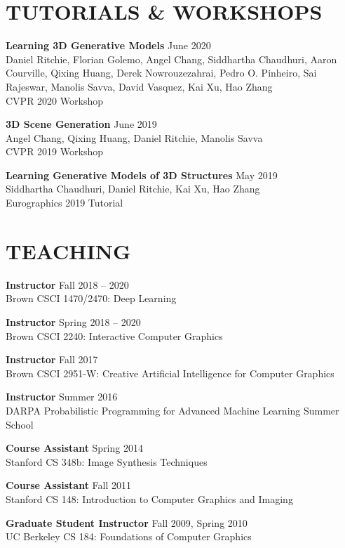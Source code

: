 \documentclass[line,margin]{res}
\begin{document}
\begin{resume}
\section{TUTORIALS \& WORKSHOPS}

\newcommand{\tutorial}[4] {
	\textbf{#1} \hfill #4\\
	#2\\
	#3
}
\newcommand{\workshop}[4] {
	\textbf{#1} \hfill #4\\
	#2\\
	#3
}

\workshop
{Learning 3D Generative Models}
{Daniel Ritchie, Florian Golemo, Angel Chang, Siddhartha Chaudhuri, Aaron Courville, Qixing Huang, Derek Nowrouzezahrai, Pedro O. Pinheiro, Sai Rajeswar, Manolis Savva, David Vasquez, Kai Xu, Hao Zhang}
{CVPR 2020 Workshop}
{June 2020}

\workshop
{3D Scene Generation}
{Angel Chang, Qixing Huang, Daniel Ritchie, Manolis Savva}
{CVPR 2019 Workshop}
{June 2019}

\tutorial
{Learning Generative Models of 3D Structures}
{Siddhartha Chaudhuri, Daniel Ritchie, Kai Xu, Hao Zhang}
{Eurographics 2019 Tutorial}
{May 2019}


\section{TEACHING}

\newcommand{\teach}[3] {
	\textbf{#1} \hfill #3\\
	#2
}

\teach
{Instructor}
{Brown CSCI 1470/2470: Deep Learning}
{Fall 2018 -- 2020}

\teach
{Instructor}
{Brown CSCI 2240: Interactive Computer Graphics}
{Spring 2018 -- 2020}

\teach
{Instructor}
{Brown CSCI 2951-W: Creative Artificial Intelligence for Computer Graphics}
{Fall 2017}

\teach
{Instructor}
{DARPA Probabilistic Programming for Advanced Machine Learning Summer School}
{Summer 2016}

\teach
{Course Assistant}
{Stanford CS 348b: Image Synthesis Techniques}
{Spring 2014}

\teach
{Course Assistant}
{Stanford CS 148: Introduction to Computer Graphics and Imaging}
{Fall 2011}

\teach
{Graduate Student Instructor}
{UC Berkeley CS 184: Foundations of Computer Graphics}
{Fall 2009, Spring 2010}


\end{resume}
\end{document}
